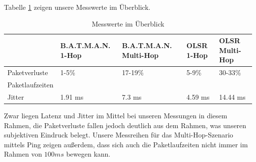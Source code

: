 \documentclass[a4paper,10pt]{article}
\begin{document}
Tabelle \ref{measures} zeigen unsere Messwerte im Überblick.

\begin{table}[htb]
\begin{tabular}{|l||l|l|l|l|}
\hline
& B.A.T.M.A.N. 1-Hop & B.A.T.M.A.N. Multi-Hop & OLSR 1-Hop & OLSR Multi-Hop \\
\hline
\hline
Paketverluste & 1-5\% & 17-19\% & 5-9\% & 30-33\% \\ 
\hline
Paketlaufzeiten & & & & \\
\hline
Jitter & 1.91 ms & 7.3 ms & 4.59 ms & 14.44 ms \\ 
\hline
\end{tabular}
\caption{Messwerte im Überblick}
\label{measures}
\end{table}

Zwar liegen Latenz und Jitter im Mittel bei unseren Messungen in diesem Rahmen, 
die Paketverluste fallen jedoch deutlich aus dem Rahmen, 
was unseren subjektiven Eindruck belegt.
Unsere Messreihen für das Multi-Hop-Szenario mittels Ping zeigen außerdem, 
dass sich auch die Paketlaufzeiten nicht immer im Rahmen von $100ms$ bewegen kann. 
\end{document}
